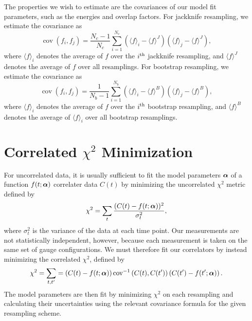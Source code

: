 The properties we wish to estimate are the covariances of our model fit parameters, such as the energies and overlap factors. For jackknife resampling, we estimate the covariance as
\begin{equation}
    \operatorname{cov}(f_i, f_j) = \frac{N_c - 1}{N_c}\sum_{i=1}^{N_c}\left(\langle f \rangle_i - \langle f \rangle^J\right)\left(\langle f \rangle_j - \langle f \rangle^J\right),
\end{equation}
where $\langle f \rangle_i$ denotes the average of $f$ over the $i^{\rm{th}}$ jackknife resampling, and $\langle f \rangle^J$ denotes the average of $f$ over all resamplings. For bootstrap resampling, we estimate the covariance as
\begin{equation}
    \operatorname{cov}(f_i, f_j) = \frac{1}{N_b-1}\sum_{i=1}^{N_b}\left(\langle f \rangle_i - \langle f \rangle^B\right)\left(\langle f \rangle_j - \langle f \rangle^B\right),
\end{equation}
where $\langle f \rangle_i$ denotes the average of $f$ over the $i^{\rm{th}}$ bootstrap resampling, and $\langle f \rangle^B$ denotes the average of $\langle f \rangle_i$ over all bootstrap resamplings.
\section{Correlated $\chi^2$ Minimization}
For uncorrelated data, it is usually sufficient to fit the model parameters $\boldsymbol{\alpha}$ of a function $f(t;\boldsymbol{\alpha})$ correlater data $C(t)$ by minimizing the uncorrelated $\chi^2$ metric defined by
\begin{equation}
    \chi^{2}=\sum_{t} \frac{(C(t)-f(t;\boldsymbol{\alpha}))^{2}}{\sigma_{t}^{2}},
\end{equation}
where $\sigma_t^2$ is the variance of the data at each time point. Our measurements are not statistically independent, however, because each measurement is taken on the same set of gauge configurations. We must therefore fit our correlators by instead minimizing the correlated $\chi^2$, defined by
\begin{equation}\label{eq:corr_chisq}
    \chi^{2}= \sum_{t,t^\prime} = \left(C(t) - f(t;\boldsymbol{\alpha})\right)\operatorname{cov}^{-1}\left(C(t), C(t^\prime)\right)\left(C(t^\prime) - f(t^\prime; \boldsymbol{\alpha})\right).
\end{equation}
The model parameters are then fit by minimizing $\chi^2$ on each resampling and calculating their uncertainties using the relevant covariance formula for the given resampling scheme.